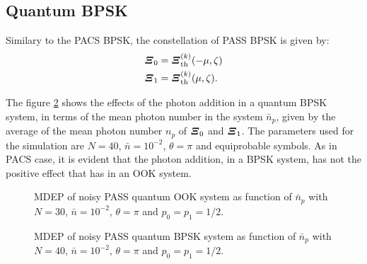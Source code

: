     \subsection{Quantum BPSK}
        Similary to the PACS BPSK, the constellation of PASS BPSK is given by:
        \begin{subequations}
            \begin{align}
                \bm{\relax{\varXi}}_0 &= \bm{\relax{\varXi}}_{\mathrm{th}}^{(k)}(-\mu,\zeta)\\
                \bm{\relax{\varXi}}_1 &= \bm{\relax{\varXi}}_{\mathrm{th}}^{(k)}(\mu,\zeta).
            \end{align}
        \end{subequations}
        
        The figure \ref{fig:3.7} shows the effects of the photon addition in a quantum BPSK
        system, in terms of the mean photon number in the system $\bar{n}_p$, given by the average of 
        the mean photon number $n_p$ of $\bm{\relax{\varXi}}_0$ and $\bm{\relax{\varXi}}_1$. The parameters used
        for the simulation are $N=40$, $\bar{n}=10^{-2}$, $\theta=\pi$ and equiprobable symbols.
        As in PACS case, it is evident that the photon addition, in a BPSK system, has not
        the positive effect that has in an OOK system.
        
        \begin{figure}[t]
            \begin{center}
                
                \caption{MDEP of noisy PASS quantum OOK system as function of $\bar{n}_p$ with
                $N=30$, $\bar{n}=10^{-2}$, $\theta=\pi$ and $p_0=p_1=1/2$.}
                \label{fig:3.6}
            \end{center}
        \end{figure}
        \begin{figure}[t]
            \begin{center}
                
                \caption{MDEP of noisy PASS quantum BPSK system as function of $\bar{n}_p$ with
                $N=40$, $\bar{n}=10^{-2}$, $\theta=\pi$ and $p_0=p_1=1/2$.}
                \label{fig:3.7}
            \end{center}
        \end{figure}